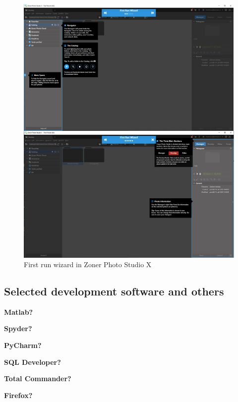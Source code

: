 \documentclass[a4paper,10pt,twoside]{article}
\begin{document}
\vspace{0.3cm}
\begin{figure}[hbt!] 
\begin{center}
\includegraphics[width=15cm]{../pictures/zoner.png} 
\caption[First run wizard in Zoner Photo Studio X]{First run wizard in Zoner Photo Studio X}
\label{fig:zoner}
\end{center}
\end{figure}

\subsection{Selected development software and others}

\noindent \textbf{Matlab?}

\noindent \textbf{Spyder?}

\noindent \textbf{PyCharm?}

\noindent \textbf{SQL Developer?}

\noindent \textbf{Total Commander?}

\noindent \textbf{Firefox?}
\end{document}
